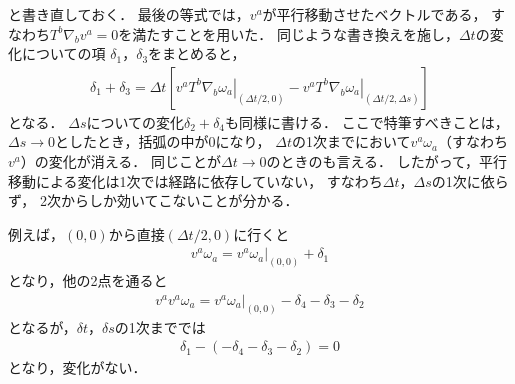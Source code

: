 \documentclass[a4paper]{jsarticle}
\begin{document}
と書き直しておく．
最後の等式では，$v^a$が平行移動させたベクトルである，
すなわち$T^b \nabla_b v^a = 0$を満たすことを用いた．
同じような書き換えを施し，$\Delta t$の変化についての項
$\delta_1$，$\delta_3$をまとめると，
\begin{align}
	\delta_1 + \delta_3 =
	\Delta t \left[ v^a \left. T^b \nabla_b \omega_a \right|_{(\Delta t/2, 0)}
	- v^a \left. T^b \nabla_b \omega_a \right|_{(\Delta t/2, \Delta s)} \right]
\end{align}
となる．
$\Delta s$についての変化$\delta_2 + \delta_4$も同様に書ける．
ここで特筆すべきことは，$\Delta s \rightarrow 0$としたとき，括弧の中が0になり，
$\Delta t$の1次までにおいて$v^a \omega_a$（すなわち$v^a$）の変化が消える．
同じことが$\Delta t \rightarrow 0$のときのも言える．
したがって，平行移動による変化は1次では経路に依存していない，
すなわち$\Delta t$，$\Delta s$の1次に依らず，
2次からしか効いてこないことが分かる．
\begin{itembox}
	例えば，$(0, 0)$から直接$(\Delta t/2, 0)$に行くと
	\begin{align}
		v^a \omega_a = \left. v^a \omega_a \right|_{(0, 0)} + \delta_1
	\end{align}
	となり，他の2点を通ると
	\begin{align}
		v^a v^a \omega_a = \left. v^a \omega_a \right|_{(0, 0)}
		- \delta_4 - \delta_3 - \delta_2
	\end{align}
	となるが，$\delta t$，$\delta s$の1次まででは
	\begin{align}
		\delta_1 - ( - \delta_4 - \delta_3 - \delta_2 ) = 0
	\end{align}
	となり，変化がない．
\end{itembox}
\end{document}
